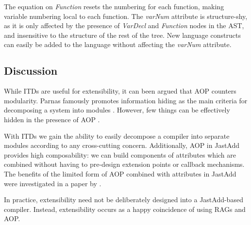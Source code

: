 \documentclass[10pt, twoside, openright]{book}
\begin{document}
\noindent
The equation on \emph{Function} resets the numbering for each function, making
variable numbering local to each function.
The \emph{varNum} attribute is structure-shy, as it is only affected by the presence of
\emph{VarDecl} and \emph{Function} nodes in the AST, and insensitive to
the structure of the rest of the tree. New language constructs can easily be added to the
language without affecting the \emph{varNum} attribute.


\subsection{Discussion}



While ITDs are useful for extensibility, it can been argued that AOP counters modularity.
Parnas famously promotes information hiding as the main
criteria for decomposing a system into modules \cite{DBLP:journals/cacm/Parnas72a}.
However, few things can be effectively hidden in the presence of AOP \cite{DBLP:conf/oopsla/Steimann06}.

With ITDs we gain the ability to easily decompose a compiler
into separate modules according to any cross-cutting concern. Additionally,
AOP in JastAdd provides high composability: we can build components of attributes which
are combined without having to pre-design extension points or callback mechanisms.
The benefits of the limited form of AOP combined with attributes in JastAdd were investigated
in a paper by \textcite{DBLP:conf/aosd/AvgustinovET08}.

In practice, extensibility need not be deliberately designed into a JastAdd-based compiler.
Instead, extensibility occurs as a happy
coincidence of using RAGs and AOP.

\end{document}
